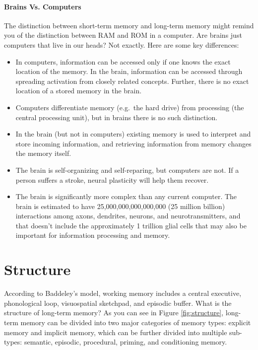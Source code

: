 \documentclass[
]{krantz}
\providecommand{\tightlist}{%
  \setlength{\itemsep}{0pt}\setlength{\parskip}{0pt}}
\begin{document}
\hypertarget{brains-vs.-computers}{%
\paragraph*{Brains Vs. Computers}\label{brains-vs.-computers}}

The distinction between short-term memory and long-term memory might remind you of the distinction between RAM and ROM in a computer. Are brains just computers that live in our heads? Not exactly. Here are some key differences:

\begin{itemize}
\tightlist
\item
  In computers, information can be accessed only if one knows the exact location of the memory. In the brain, information can be accessed through spreading activation from closely related concepts. Further, there is no exact location of a stored memory in the brain.
\item
  Computers differentiate memory (e.g.~the hard drive) from processing (the central processing unit), but in brains there is no such distinction.
\item
  In the brain (but not in computers) existing memory is used to interpret and store incoming information, and retrieving information from memory changes the memory itself.
\item
  The brain is self-organizing and self-reparing, but computers are not. If a person suffers a stroke, neural plasticity will help them recover.
\item
  The brain is significantly more complex than any current computer. The brain is estimated to have 25,000,000,000,000,000 (25 million billion) interactions among axons, dendrites, neurons, and neurotransmitters, and that doesn't include the approximately 1 trillion glial cells that may also be important for information processing and memory.
\end{itemize}

\hypertarget{structure}{%
\section{Structure}\label{structure}}

According to Baddeley's model, working memory includes a central executive, phonological loop, visuospatial sketchpad, and episodic buffer. What is the structure of long-term memory? As you can see in Figure \ref{fig:structure}, long-term memory can be divided into two major categories of memory types: explicit memory and implicit memory, which can be further divided into multiple sub-types: semantic, episodic, procedural, priming, and conditioning memory.
\end{document}
